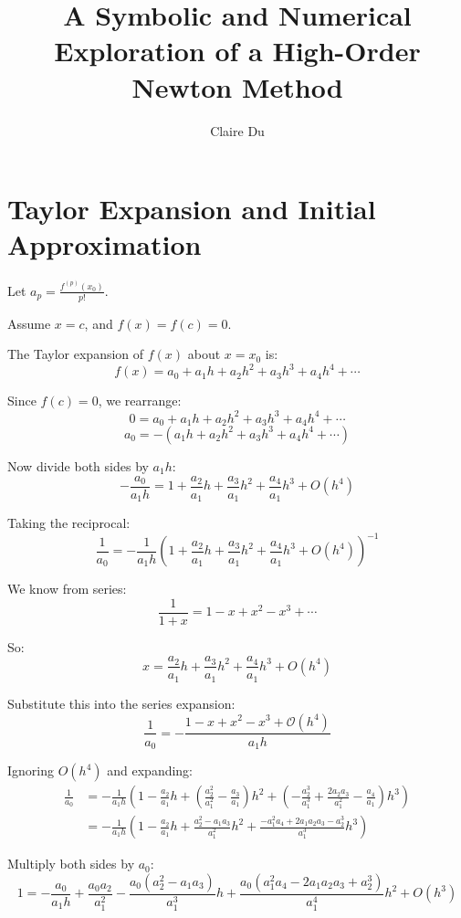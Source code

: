 \documentclass[12pt]{article}
\title{A Symbolic and Numerical Exploration of a High-Order Newton Method}
\author{Claire Du}
\date{}
\begin{document}
\maketitle

\section*{ Taylor Expansion and Initial Approximation}


Let \( a_p = \frac{f^{(p)}(x_0)}{p!} \).

Assume \( x = c \), and \( f(x) = f(c) = 0 \).

The Taylor expansion of \( f(x) \) about \( x = x_0 \) is:
\[
    f(x) = a_0 + a_1 h + a_2 h^2 + a_3 h^3 + a_4 h^4 + \cdots
\]

Since \( f(c) = 0 \), we rearrange:
\[
    0 = a_0 + a_1 h + a_2 h^2 + a_3 h^3 + a_4 h^4 + \cdots
\]
\[
    a_0 = - (a_1 h + a_2 h^2 + a_3 h^3 + a_4 h^4 + \cdots)
\]

Now divide both sides by \( a_1 h \):
\[
    -\frac{a_0}{a_1 h} = 1 + \frac{a_2}{a_1} h + \frac{a_3}{a_1} h^2 + \frac{a_4}{a_1} h^3 + O(h^4)
\]

Taking the reciprocal:
\[
    \frac{1}{{a_0}} = -\frac{1}{a_1h} \left( 1 + \frac{a_2}{a_1} h + \frac{a_3}{a_1} h^2 + \frac{a_4}{a_1} h^3 + O(h^4) \right)^{-1}
\]

We know from series:
\[
    \frac{1}{1 + x} = 1 - x + x^2 - x^3 + \cdots
\]

So:
\[
    x = \frac{a_2}{a_1} h + \frac{a_3}{a_1} h^2 + \frac{a_4}{a_1} h^3 + O(h^4)
\]

Substitute this into the series expansion:
\[
\frac{1}{a_0} = - \frac{1 - x + x^2 - x^3 + \mathcal{O}(h^4)}{a_1 h}
\]

Ignoring \( O(h^4) \) and expanding:
\[
\begin{aligned}
    \frac{1}{a_0} &= -\frac{1}{a_1 h} \left( 1 - \frac{a_2}{a_1} h + \left( \frac{a_2^2}{a_1^2} - \frac{a_3}{a_1} \right) h^2 + \left( -\frac{a_2^3}{a_1^3} + \frac{2 a_2 a_3}{a_1^2} - \frac{a_4}{a_1} \right) h^3 \right) \\
    &= -\frac{1}{a_1 h} \left( 1 - \frac{a_2}{a_1} h + \frac{a_2^2 - a_1 a_3}{a_1^2} h^2 + \frac{-a_1^2 a_4 + 2 a_1 a_2 a_3 - a_2^3}{a_1^3} h^3 \right)
\end{aligned}
\]

Multiply both sides by \( a_0 \):
\[
1 = -\frac{a_0}{a_1 h} + \frac{a_0 a_2}{a_1^2} - \frac{a_0 (a_2^2 - a_1 a_3)}{a_1^3} h + \frac{a_0 (a_1^2 a_4 - 2 a_1 a_2 a_3 + a_2^3)}{a_1^4} h^2 + O(h^3)
\]
\end{document}
